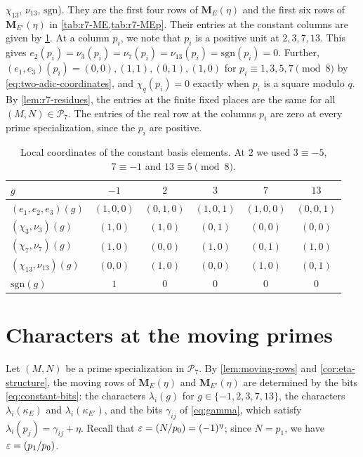 \documentclass[12pt,oneside,openany]{book}
\theoremstyle{definition}
\theoremstyle{plain}
\numberwithin{equation}{chapter}
\theoremstyle{plain}
\theoremstyle{definition}
\theoremstyle{remark}
\newcommand{\leg}[2]{\mathchoice{\left(\frac{#1}{#2}\right)}{(#1/#2)}{(#1/#2)}{(#1/#2)}}
\newcommand{\cP}{\mathcal P}
\newcommand{\eps}{\varepsilon}
\begin{document}
$\chi_{13}$, $\nu_{13}$, $\mathrm{sgn}$). They are the first four rows of
$\mathbf M_E(\eta)$ and the first six rows of $\mathbf M_{E'}(\eta)$ in \cref{tab:r7-ME,tab:r7-MEp}. Their entries at the
constant columns are given by \cref{tab:r7-coords}. At a column $p_i$, we
note that $p_i$ is a positive unit at $2,3,7,13$. This gives
$e_2(p_i)=\nu_3(p_i)=\nu_7(p_i)=\nu_{13}(p_i)=\mathrm{sgn}(p_i)=0$.
Further, $(e_1,e_3)(p_i)=(0,0),(1,1),(0,1),(1,0)$ for
$p_i\equiv1,3,5,7\pmod8$ by \eqref{eq:two-adic-coordinates}, and
$\chi_q(p_i)=0$ exactly when $p_i$ is a square modulo $q$. By
\cref{lem:r7-residues}, the entries at the finite fixed places are the
same for all $(M,N)\in\cP_7$. The entries of the real row at the columns
$p_i$ are zero at every prime specialization, since the $p_i$ are positive.

\begin{table}[htbp]
\centering
\caption{Local coordinates of the constant basis elements. At $2$ we used
$3\equiv-5$, $7\equiv-1$ and $13\equiv5\pmod8$.}
\label{tab:r7-coords}
\begin{tabular}{lccccc}
\toprule
$g$ & $-1$ & $2$ & $3$ & $7$ & $13$\\
\midrule
$(e_1,e_2,e_3)(g)$ & $(1,0,0)$ & $(0,1,0)$ & $(1,0,1)$ & $(1,0,0)$ & $(0,0,1)$\\
$(\chi_3,\nu_3)(g)$ & $(1,0)$ & $(1,0)$ & $(0,1)$ & $(0,0)$ & $(0,0)$\\
$(\chi_7,\nu_7)(g)$ & $(1,0)$ & $(0,0)$ & $(1,0)$ & $(0,1)$ & $(1,0)$\\
$(\chi_{13},\nu_{13})(g)$ & $(0,0)$ & $(1,0)$ & $(0,0)$ & $(1,0)$ & $(0,1)$\\
$\mathrm{sgn}(g)$ & $1$ & $0$ & $0$ & $0$ & $0$\\
\bottomrule
\end{tabular}
\end{table}

\section{Characters at the moving primes}\label{sec:r7-characters}

Let $(M,N)$ be a prime specialization in $\cP_7$. By \cref{lem:moving-rows}
and \cref{cor:eta-structure}, the moving rows of $\mathbf M_E(\eta)$ and
$\mathbf M_{E'}(\eta)$ are determined by the bits \eqref{eq:constant-bits}:
the characters $\lambda_i(g)$ for $g\in\{-1,2,3,7,13\}$, the characters
$\lambda_i(\kappa_E)$ and $\lambda_i(\kappa_{E'})$, and the bits
$\gamma_{ij}$ of \eqref{eq:gamma}, which satisfy
$\lambda_i(p_j)=\gamma_{ij}+\eta$. Recall
that $\eps=\leg N{p_0}=(-1)^\eta$; since $N=p_1$, we have
$\eps=\leg{p_1}{p_0}$.
\end{document}
